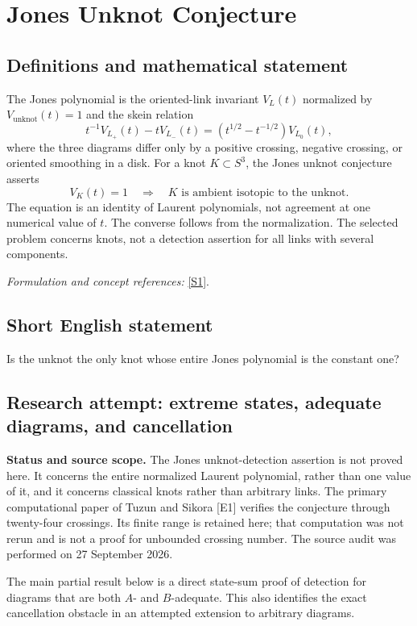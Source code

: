 \documentclass[11pt]{article}
\begin{document}
\section*{\texorpdfstring{Jones Unknot Conjecture}{Jones Unknot Conjecture}}\label{339}
\subsection{Definitions and mathematical statement}
The Jones polynomial is the oriented-link invariant $V_L(t)$ normalized by $V_{\mathrm{unknot}}(t)=1$ and the skein relation
\[
 t^{-1}V_{L_+}(t)-tV_{L_-}(t)
 =(t^{1/2}-t^{-1/2})V_{L_0}(t),
\]
where the three diagrams differ only by a positive crossing, negative crossing, or oriented smoothing in a disk. For a knot $K\subset S^3$, the Jones unknot conjecture asserts
\[
 V_K(t)=1\quad\Longrightarrow\quad K\text{ is ambient isotopic to the unknot}.
\]
The equation is an identity of Laurent polynomials, not agreement at one numerical value of $t$. The converse follows from the normalization. The selected problem concerns knots, not a detection assertion for all links with several components.
\par\smallskip\textit{Formulation and concept references:} \href{https://encyclopediaofmath.org/wiki/Jones_unknotting_conjecture}{[S1]}.

\subsection{Short English statement}
Is the unknot the only knot whose entire Jones polynomial is the constant one?
\subsection{Research attempt: extreme states, adequate diagrams, and cancellation}
\textbf{Status and source scope.} The Jones unknot-detection assertion is not proved here. It concerns the entire normalized Laurent polynomial, rather than one value of it, and it concerns classical knots rather than arbitrary links. The primary computational paper of Tuzun and Sikora [E1] verifies the conjecture through twenty-four crossings. Its finite range is retained here; that computation was not rerun and is not a proof for unbounded crossing number. The source audit was performed on 27 September 2026.

The main partial result below is a direct state-sum proof of detection for diagrams that are both $A$- and $B$-adequate. This also identifies the exact cancellation obstacle in an attempted extension to arbitrary diagrams.
\end{document}
